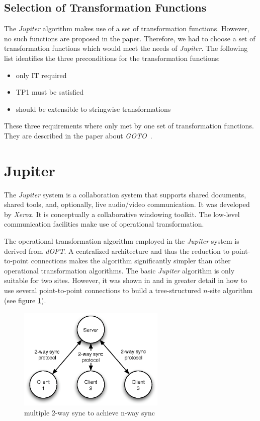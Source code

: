 \subsection{Selection of Transformation Functions}
The \emph{Jupiter} algorithm makes use of a set of transformation functions.
However, no such functions are proposed in the paper. Therefore, we had to 
choose a set of transformation functions which would meet the needs of 
\emph{Jupiter}. The following list identifies the three preconditions for the 
transformation functions:

\begin{itemize}
 \item only IT required
 \item TP1 must be satisfied
 \item should be extensible to stringwise transformations
\end{itemize}

These three requirements where only met by one set of transformation
functions. They are described in the paper about \emph{GOTO}~\cite{sun98a}.



\section{Jupiter}
The \emph{Jupiter} system is a collaboration system that supports shared 
documents, shared tools, and, optionally, live audio/video communication. It was 
developed by \emph{Xerox}. It is conceptually a collaborative windowing toolkit. 
The low-level communication facilities make use of operational transformation.

The operational transformation algorithm employed in the \emph{Jupiter} system is derived from \emph{dOPT}. A centralized architecture and thus the reduction to point-to-point connections makes the algorithm significantly simpler than other operational transformation algorithms. The basic \emph{Jupiter} algorithm is only suitable for two sites. However, it was shown in \cite{jupiter95} and in greater detail in \cite{netedit:thesis} how to use several point-to-point connections to build a tree-structured $n$-site algorithm (see figure \ref{fig:concepts.nway}).

\begin{figure}[htb]
 \centering
 \includegraphics[width=7cm,height=4.89cm]{../images/finalreport/concepts_nway.eps}
 \caption{multiple 2-way sync to achieve n-way sync}
 \label{fig:concepts.nway}
\end{figure}

